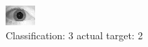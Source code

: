 \begin{figure}[h!]
\begin{center}
\includegraphics[width=0.60\columnwidth]{figures/ID1712_class_3_target_2.png}
\end{center}
\caption{ Classification: 3 actual target: 2}
\label{fig:ID1712_class_3_target_2}
\end{figure}

